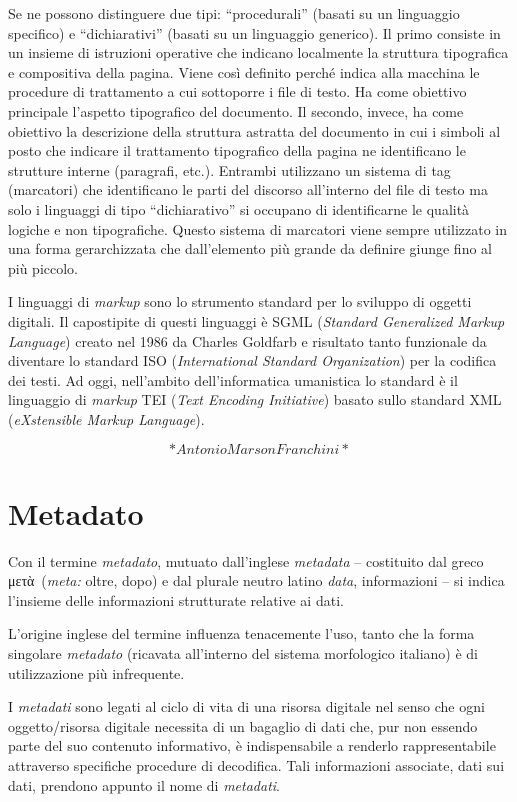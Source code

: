 \documentclass[
  b5paper,
  twoside,
  11pt,
  chapterprefix=false,
  bibliography=totocnumbered,
  listof=flat]{scrbook}
\begin{document}
Se ne possono distinguere due tipi: \enquote{procedurali} (basati su un
linguaggio specifico) e \enquote{dichiarativi} (basati su un linguaggio
generico). Il primo consiste in un insieme di istruzioni operative che
indicano localmente la struttura tipografica e compositiva della pagina.
Viene così definito perché indica alla macchina le procedure di
trattamento a cui sottoporre i file di testo. Ha come obiettivo
principale l'aspetto tipografico del documento. Il secondo, invece, ha
come obiettivo la descrizione della struttura astratta del documento in
cui i simboli al posto che indicare il trattamento tipografico della
pagina ne identificano le strutture interne (paragrafi, etc.). Entrambi
utilizzano un sistema di tag (marcatori) che identificano le parti del
discorso all'interno del file di testo ma solo i linguaggi di tipo
\enquote{dichiarativo} si occupano di identificarne le qualità logiche e non
tipografiche. Questo sistema di marcatori viene sempre utilizzato in una
forma gerarchizzata che dall'elemento più grande da definire giunge fino
al più piccolo.

I linguaggi di \emph{markup} sono lo strumento standard per lo sviluppo di
oggetti digitali. Il capostipite di questi linguaggi è SGML (\emph{Standard
Generalized Markup Language}) creato nel 1986 da Charles Goldfarb e
risultato tanto funzionale da diventare lo standard ISO (\emph{International
Standard Organization}) per la codifica dei testi. Ad oggi, nell'ambito
dell'informatica umanistica lo standard è il linguaggio di \emph{markup} TEI
(\emph{Text Encoding Initiative}) basato sullo standard XML (\emph{eXstensible
Markup Language}).

\[*Antonio Marson Franchini*\]

\hypertarget{metadato}{%
\chapter{Metadato}\label{metadato}}

Con il termine \emph{metadato}, mutuato dall'inglese \emph{metadata} -- costituito
dal greco μετὰ~(\emph{meta:} oltre, dopo) e dal plurale neutro latino \emph{data},
informazioni -- si indica l'insieme delle informazioni strutturate
relative ai dati.

L'origine inglese del termine influenza tenacemente l'uso, tanto che la
forma singolare \emph{metadato} (ricavata all'interno del sistema morfologico
italiano) è di utilizzazione più infrequente.

I \emph{metadati} sono legati al ciclo di vita di una risorsa digitale nel
senso che ogni oggetto/risorsa digitale necessita di un bagaglio di dati
che, pur non essendo parte del suo contenuto informativo, è
indispensabile a renderlo rappresentabile attraverso specifiche
procedure di decodifica. Tali informazioni associate, dati sui dati,
prendono appunto il nome di \emph{metadati}.
\end{document}
